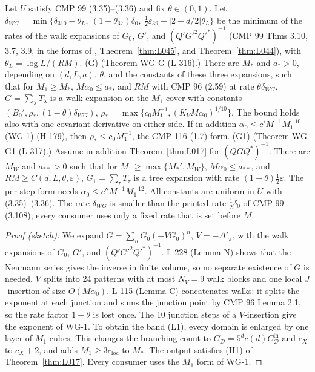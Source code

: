 \begin{theorem}\label{thm:L018}
Let $U$ satisfy CMP 99 (3.35)--(3.36) and fix $\theta\in(0,1)$. Let $\delta_{WG}=\min\{\delta_{310}-\theta_L,\ (1-\theta_{37})\delta_0,\ \tfrac12\varepsilon_{39}-|2-d/2|\theta_L\}$ be the minimum of the rates of the walk expansions of $G_0$, $G'$, and $(Q'G'^2Q'^*)^{-1}$ (CMP 99 Thms 3.10, 3.7, 3.9, in the forms of , Theorem~\ref{thm:L045}, and Theorem~\ref{thm:L044}), with $\theta_L=\log L/(RM)$.
(G) (Theorem WG-G (L-316).) There are $M_*$ and $a_*>0$, depending on $(d,L,a)$, $\theta$, and the constants of these three expansions, such that for $M_1\ge M_*$, $M\alpha_0\le a_*$, and $RM$ with CMP 96 (2.59) at rate $\theta\delta_{WG}$, $G=\sum_\lambda T_\lambda$ is a walk expansion on the $M_1$-cover with constants $(B_0',\rho_*,(1-\theta)\delta_{WG})$, $\rho_*=\max\{c_0M_1^{-1},(K_VM\alpha_0)^{1/10}\}$. The bound holds also with one covariant derivative on either side. If in addition $\alpha_0\le c'M^{-1}M_1^{-10}$ (WG-1) (H-179), then $\rho_*\le c_0M_1^{-1}$, the CMP 116 (1.7) form.
(G1) (Theorem WG-G1 (L-317).) Assume in addition Theorem~\ref{thm:L017} for $(QGQ^*)^{-1}$. There are $M_W$ and $a_{**}>0$ such that for $M_1\ge\max\{M_*',M_W\}$, $M\alpha_0\le a_{**}$, and $RM\ge C(d,L,\theta,\varepsilon)$, $G_1=\sum_\tau T_\tau$ is a tree expansion with rate $(1-\theta)\tfrac12\varepsilon$. The per-step form needs $\alpha_0\le c''M^{-1}M_1^{-12}$.
All constants are uniform in $U$ with (3.35)--(3.36). The rate $\delta_{WG}$ is smaller than the printed rate $\tfrac12\delta_0$ of CMP 99 (3.108); every consumer uses only a fixed rate that is set before $M$.
\end{theorem}
\begin{proof}[Proof (sketch)]
We expand $G=\sum_nG_0(-VG_0)^n$, $V=-\Delta'_\pi$, with the walk expansions of $G_0$, $G'$, and $(Q'G'^2Q'^*)^{-1}$. L-228 (Lemma N) shows that the Neumann series gives the inverse in finite volume, so no separate existence of $G$ is needed. $V$ splits into 24 patterns with at most $N_V=9$ walk blocks and one local $J$-insertion of size $O(M\alpha_0)$. L-115 (Lemma C) concatenates walks: it splits the exponent at each junction and sums the junction point by CMP 96 Lemma 2.1, so the rate factor $1-\theta$ is lost once. The 10 junction steps of a $V$-insertion give the exponent of WG-1. To obtain the band (L1), every domain is enlarged by one layer of $M_1$-cubes. This changes the branching count to $C_{\mathcal D}=5^dc(d)C_{\mathcal D}^{\mathrm{in}}$ and $c_X$ to $c_X+2$, and adds $M_1\ge3c_{\mathrm{loc}}$ to $M_*$. The output satisfies (H1) of Theorem~\ref{thm:L017}. Every consumer uses the $M_1$ form of WG-1.
\end{proof}
